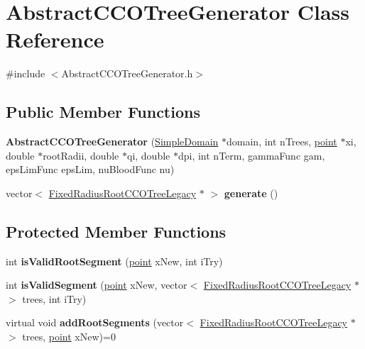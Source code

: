 \hypertarget{class_abstract_c_c_o_tree_generator}{}\section{Abstract\+C\+C\+O\+Tree\+Generator Class Reference}
\label{class_abstract_c_c_o_tree_generator}


{\ttfamily \#include $<$Abstract\+C\+C\+O\+Tree\+Generator.\+h$>$}

\subsection*{Public Member Functions}
\begin{DoxyCompactItemize}
\item 
\mbox{\label{class_abstract_c_c_o_tree_generator_a05e22c19531a6e6b385b93a5285e5ac4}} 
{\bfseries Abstract\+C\+C\+O\+Tree\+Generator} (\mbox{\hyperlink{class_simple_domain}{Simple\+Domain}} $\ast$domain, int n\+Trees, \mbox{\hyperlink{structpoint}{point}} $\ast$xi, double $\ast$root\+Radii, double $\ast$qi, double $\ast$dpi, int n\+Term, gamma\+Func gam, eps\+Lim\+Func eps\+Lim, nu\+Blood\+Func nu)
\item 
\mbox{\label{class_abstract_c_c_o_tree_generator_a1429db3e7545f4004bdd04388bec9dbe}} 
vector$<$ \mbox{\hyperlink{class_fixed_radius_root_c_c_o_tree_legacy}{Fixed\+Radius\+Root\+C\+C\+O\+Tree\+Legacy}} $\ast$ $>$ {\bfseries generate} ()
\end{DoxyCompactItemize}
\subsection*{Protected Member Functions}
\begin{DoxyCompactItemize}
\item 
\mbox{\label{class_abstract_c_c_o_tree_generator_ae692841a924a40eed1a4a23d3d9910cb}} 
int {\bfseries is\+Valid\+Root\+Segment} (\mbox{\hyperlink{structpoint}{point}} x\+New, int i\+Try)
\item 
\mbox{\label{class_abstract_c_c_o_tree_generator_a7e971a13795a519702083f1f199a8d97}} 
int {\bfseries is\+Valid\+Segment} (\mbox{\hyperlink{structpoint}{point}} x\+New, vector$<$ \mbox{\hyperlink{class_fixed_radius_root_c_c_o_tree_legacy}{Fixed\+Radius\+Root\+C\+C\+O\+Tree\+Legacy}} $\ast$$>$ trees, int i\+Try)
\item 
\mbox{\label{class_abstract_c_c_o_tree_generator_a2b1836a3d2c3eaf7ffb992ba485b139d}} 
virtual void {\bfseries add\+Root\+Segments} (vector$<$ \mbox{\hyperlink{class_fixed_radius_root_c_c_o_tree_legacy}{Fixed\+Radius\+Root\+C\+C\+O\+Tree\+Legacy}} $\ast$$>$ trees, \mbox{\hyperlink{structpoint}{point}} x\+New)=0
\end{DoxyCompactItemize}


